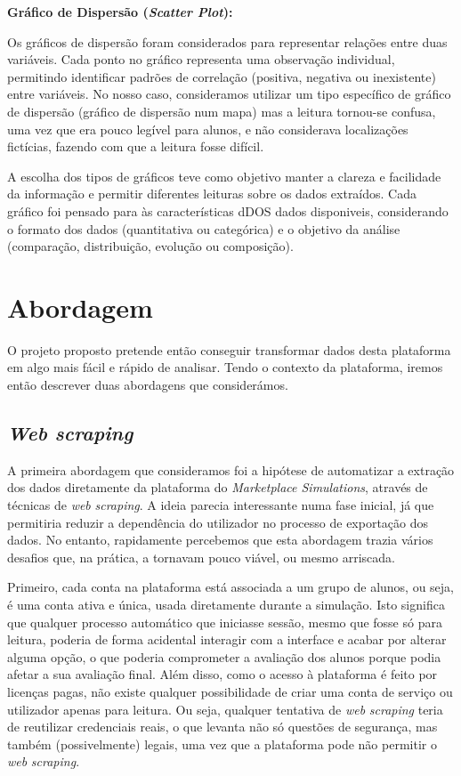 \textbf{Gráfico de Dispersão (\textit{Scatter Plot}):}

Os gráficos de dispersão foram considerados para representar relações entre duas variáveis. Cada ponto no gráfico representa uma observação individual, permitindo identificar padrões de correlação (positiva, negativa ou inexistente) entre variáveis. No nosso caso, consideramos utilizar um tipo específico de gráfico de dispersão (gráfico de dispersão num mapa) mas a leitura tornou-se confusa, uma vez que era pouco legível para alunos, e não considerava localizações fictícias, fazendo com que a leitura fosse difícil.

A escolha dos tipos de gráficos teve como objetivo manter a clareza e facilidade da informação e permitir diferentes leituras sobre os dados extraídos. Cada gráfico foi pensado para às características dDOS dados disponiveis, considerando o formato dos dados (quantitativa ou categórica) e o objetivo da análise (comparação, distribuição, evolução ou composição).

\section{Abordagem}
\label{sec:abordagem}

O projeto proposto pretende então conseguir transformar dados desta plataforma em algo mais fácil e rápido de analisar. Tendo o contexto da plataforma, iremos então descrever duas abordagens que considerámos.

\subsection{\textit{Web \textit{scraping}}}

A primeira abordagem que consideramos foi a hipótese de automatizar a extração dos dados diretamente da plataforma do \textit{Marketplace Simulations}, através de técnicas de \textit{web} \textit{scraping}. A ideia parecia interessante numa fase inicial, já que permitiria reduzir a dependência do utilizador no processo de exportação  dos dados. No entanto, rapidamente percebemos que esta abordagem trazia vários desafios que, na prática, a tornavam pouco viável, ou mesmo arriscada.

Primeiro, cada conta na plataforma está associada a um grupo de alunos, ou seja, é uma conta ativa e única, usada diretamente durante a simulação. Isto significa que qualquer processo automático que iniciasse sessão, mesmo que fosse só para leitura, poderia de forma acidental interagir com a interface e acabar por alterar alguma opção, o que poderia comprometer a avaliação dos alunos porque podia afetar a sua avaliação final. Além disso, como o acesso à plataforma é feito por licenças pagas, não existe qualquer possibilidade de criar uma conta de serviço ou utilizador apenas para leitura. Ou seja, qualquer tentativa de \textit{web} \textit{scraping} teria de reutilizar credenciais reais, o que levanta não só questões de segurança, mas também (possivelmente) legais, uma vez que a plataforma pode não permitir o \textit{web} \textit{scraping}.


